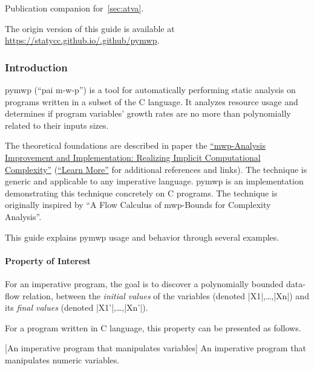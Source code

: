 Publication companion for~\autoref{sec:atva}.

The origin version of this guide is available at \url{https://statycc.github.io/.github/pymwp}.
\clearpage

\subsubsection{Introduction}
\label{guide-introduction}

pymwp (\enquote{pai m-w-p}) is a tool for automatically performing static analysis on programs written in a subset of the C language.
It analyzes resource usage and determines if program variables' growth rates are no more than polynomially related to their inputs sizes.

The theoretical foundations are described in paper the \hyperref[sec:fscd]{\enquote{mwp-Analysis Improvement and Implementation: Realizing Implicit Computational Complexity}} (\cf \hyperref[guide-learn-more]{\enquote{Learn More}} for additional references and links).
The technique is generic and applicable to any imperative language.
pymwp is an implementation demonstrating this technique concretely on C programs.
The technique is originally inspired by \enquote{A Flow Calculus of mwp-Bounds for Complexity Analysis}.

This guide explains pymwp usage and behavior through several examples.

\paragraph*{Property of Interest}

For an imperative program, the goal is to discover a polynomially bounded data-flow relation, between the \emph{initial values} of the variables (denoted \pr|X1|,\ldots{},\pr|Xn|) and its \emph{final values} (denoted \pr|X1'|,\ldots{},\pr|Xn'|).

For a program written in C language, this property can be presented as follows.

\begin{center}
\begin{minipage}{\textwidth}
\captionsetup{type=lstlisting}
[An imperative program that manipulates variables]
{An imperative program that manipulates numeric variables.}
\label{lst:guide}
\end{minipage}
\end{center}

